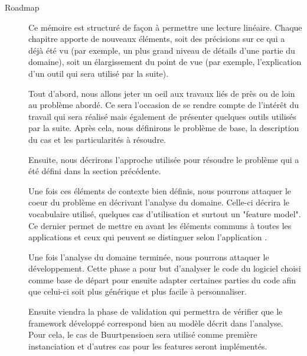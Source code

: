 \begin{description}
\item[Roadmap] 

Ce mémoire est structuré de façon à permettre une lecture linéaire.  Chaque chapitre apporte de nouveaux éléments,  soit des précisions sur ce qui a déjà été vu (par exemple,  un plus grand niveau de détails d'une partie du domaine),  soit un élargissement du point de vue (par exemple,  l'explication d'un outil qui sera utilisé par la suite).  

Tout d'abord,  nous allons jeter un oeil aux travaux liés de près ou de loin au problème abordé.  Ce sera l'occasion de se rendre compte de l'intérêt du travail qui sera réalisé mais également de présenter quelques outils utilisés par la suite.  Après cela,  nous définirons le problème de base,  la description du cas et les particularités à résoudre.  

Ensuite,  nous décrirons l'approche utilisée pour résoudre le problème qui a été défini dans la section précédente.  

Une fois ces éléments de contexte bien définis,  nous pourrons attaquer le coeur du problème en décrivant l'analyse du domaine.  Celle-ci décrira le vocabulaire utilisé,  quelques cas d'utilisation et surtout un "feature model".  Ce dernier permet de mettre en avant les éléments communs à toutes les applications et ceux qui peuvent se distinguer selon l'application \cite{GenProg}.  

Une fois l'analyse du domaine terminée,  nous pourrons attaquer le développement.  Cette phase a pour but d'analyser le code du logiciel choisi comme base de départ pour ensuite adapter certaines parties du code afin que celui-ci soit plus générique et plus facile à personnaliser.

Ensuite viendra la phase de validation qui permettra de vérifier que le framework développé correspond bien au modèle décrit dans l'analyse.  Pour cela,  le cas de Buurtpensioen sera utilisé comme première instanciation et d'autres cas pour les features seront implémentés.


\end{description}